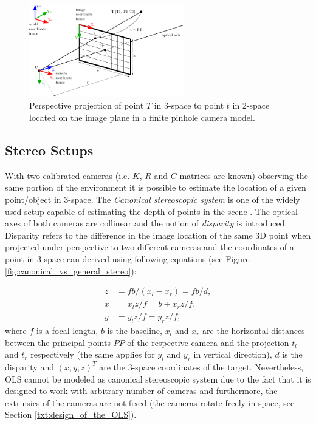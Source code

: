 \begin{figure}[tbh]
	\centering
	\includegraphics[width=0.60\textwidth]{fig/pinhole_camera.pdf}
	\caption{Perspective projection of point $T$ in 3-space to point $t$ in 2-space located on the image plane in a finite pinhole camera model.}
	\label{fig:pinhole_camera}
\end{figure}

\subsection{Stereo Setups}

With two calibrated cameras (i.e. $K$, $R$ and $C$ matrices are known) observing the same portion of the environment it is possible to estimate the location of a given point/object in 3-space. The \textit{Canonical stereoscopic system} is one of the widely used setup capable of estimating the depth of points in the scene \cite{Cyganek:2007:ICV:1214366}. The optical axes of both cameras are collinear and the notion of \textit{disparity} is introduced. Disparity refers to the difference in the image location of the same 3D point when projected under perspective to two different cameras \cite{Stockman:2001:CV:558008} and the coordinates of a point in 3-space can derived using following equations (see Figure \ref{fig:canonical_vs_general_stereo}):

\begin{align}
	z &= fb/(x_{l} - x_{r}) = fb/d,\\
	x &= x_{l}z/f = b + x_{r}z/f,\\
	y &= y_{l}z/f = y_{r}z/f,
\end{align}
where $f$ is a focal length, $b$ is the baseline, $x_{l}$ and $x_{r}$ are the horizontal distances between the principal points $PP$ of the respective camera and the projection $t_{l}$ and $t_{r}$ respectively (the same applies for $y_{l}$ and $y_{r}$ in vertical direction), $d$ is the disparity and $(x, y, z)^{T}$ are the 3-space coordinates of the target. Nevertheless, OLS cannot be modeled as canonical stereoscopic system due to the fact that it is designed to work with arbitrary number of cameras and furthermore, the extrinsics of the cameras are not fixed (the cameras rotate freely in space, see Section \ref{txt:design_of_the_OLS}).


